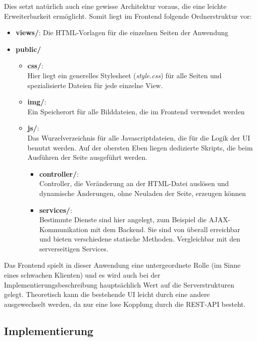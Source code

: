 Dies setzt natürlich auch eine gewisse Architektur voraus, die eine leichte Erweiterbarkeit ermöglicht. Somit liegt im Frontend folgende Ordnerstruktur vor:

\begin{itemize}
	\item \textbf{views/}: Die HTML-Vorlagen für die einzelnen Seiten der Anwendung
	\item \textbf{public/}
	\begin{itemize}
		\item \textbf{css/}:\\
		Hier liegt ein generelles Stylesheet (\textit{style.css}) für alle Seiten und spezialisierte Dateien für jede einzelne View.
		\item \textbf{img/}:\\
		Ein Speicherort für alle Bilddateien, die im Frontend verwendet werden
		\item \textbf{js/}:\\
		Das Wurzelverzeichnis für alle Javascriptdateien, die für die Logik der \ac{UI} benutzt werden. Auf der obersten Eben liegen dedizierte Skripts, die beim Ausführen der Seite ausgeführt werden.
		\begin{itemize}
			\item \textbf{controller/}:\\
			Controller, die Veränderung an der HTML-Datei auslösen und dynamische Änderungen, ohne Neuladen der Seite, erzeugen können 
			\item \textbf{services/}:\\
			Bestimmte Dienste sind hier angelegt, zum Beispiel die \gls{AJAX}-Kommunikation mit dem Backend. Sie sind von überall erreichbar und bieten verschiedene statische Methoden. Vergleichbar mit den serverseitigen Services.
		\end{itemize}
	\end{itemize}
\end{itemize}

Das Frontend spielt in dieser Anwendung eine untergeordnete Rolle (im Sinne eines schwachen Klienten) und es wird auch bei der Implementierungsbeschreibung hauptsächlich Wert auf die Serverstrukturen gelegt. Theoretisch kann die bestehende \ac{UI} leicht durch eine andere ausgewechselt werden, da nur eine lose Kopplung durch die \gls{REST}-API besteht.

\subsection{Implementierung}

